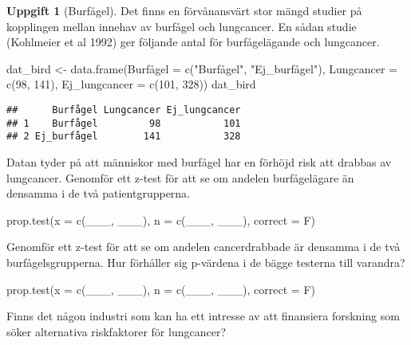 \documentclass[
]{book}
\newenvironment{Shaded}{\begin{snugshade}}{\end{snugshade}}
\newcommand{\AttributeTok}[1]{\textcolor[rgb]{0.77,0.63,0.00}{#1}}
\newcommand{\DecValTok}[1]{\textcolor[rgb]{0.00,0.00,0.81}{#1}}
\newcommand{\FunctionTok}[1]{\textcolor[rgb]{0.00,0.00,0.00}{#1}}
\newcommand{\NormalTok}[1]{#1}
\newcommand{\OtherTok}[1]{\textcolor[rgb]{0.56,0.35,0.01}{#1}}
\newcommand{\StringTok}[1]{\textcolor[rgb]{0.31,0.60,0.02}{#1}}
\theoremstyle{definition}
\theoremstyle{definition}
\theoremstyle{definition}
\newtheorem{exercise}{Uppgift}[chapter]
\theoremstyle{definition}
\theoremstyle{remark}
\begin{document}
\begin{exercise}[Burfågel]
Det finns en förvånansvärt stor mängd studier på kopplingen mellan innehav av burfågel och lungcancer. En sådan studie (Kohlmeier et al 1992) ger följande antal för burfågelägande och lungcancer.

\begin{Shaded}
\begin{Highlighting}[]
\NormalTok{dat\_bird }\OtherTok{\textless{}{-}} \FunctionTok{data.frame}\NormalTok{(Burfågel }\OtherTok{=} \FunctionTok{c}\NormalTok{(}\StringTok{"Burfågel"}\NormalTok{, }\StringTok{"Ej\_burfågel"}\NormalTok{),}
              \AttributeTok{Lungcancer =} \FunctionTok{c}\NormalTok{(}\DecValTok{98}\NormalTok{, }\DecValTok{141}\NormalTok{),}
              \AttributeTok{Ej\_lungcancer =} \FunctionTok{c}\NormalTok{(}\DecValTok{101}\NormalTok{, }\DecValTok{328}\NormalTok{))}
\NormalTok{dat\_bird}
\end{Highlighting}
\end{Shaded}

\begin{verbatim}
##      Burfågel Lungcancer Ej_lungcancer
## 1    Burfågel         98           101
## 2 Ej_burfågel        141           328
\end{verbatim}

Datan tyder på att människor med burfågel har en förhöjd risk att drabbas av lungcancer. Genomför ett z-test för att se om andelen burfågelägare än densamma i de två patientgrupperna.

\begin{Shaded}
\begin{Highlighting}[]
\FunctionTok{prop.test}\NormalTok{(}\AttributeTok{x =} \FunctionTok{c}\NormalTok{(\_\_\_, \_\_\_), }\AttributeTok{n =} \FunctionTok{c}\NormalTok{(\_\_\_, \_\_\_), }\AttributeTok{correct =}\NormalTok{ F)}
\end{Highlighting}
\end{Shaded}

Genomför ett z-test för att se om andelen cancerdrabbade är densamma i de två burfågelsgrupperna. Hur förhåller sig p-värdena i de bägge testerna till varandra?

\begin{Shaded}
\begin{Highlighting}[]
\FunctionTok{prop.test}\NormalTok{(}\AttributeTok{x =} \FunctionTok{c}\NormalTok{(\_\_\_, \_\_\_), }\AttributeTok{n =} \FunctionTok{c}\NormalTok{(\_\_\_, \_\_\_), }\AttributeTok{correct =}\NormalTok{ F)}
\end{Highlighting}
\end{Shaded}

Finns det någon industri som kan ha ett intresse av att finansiera forskning som söker alternativa riskfaktorer för lungcancer?
\end{exercise}
\end{document}
